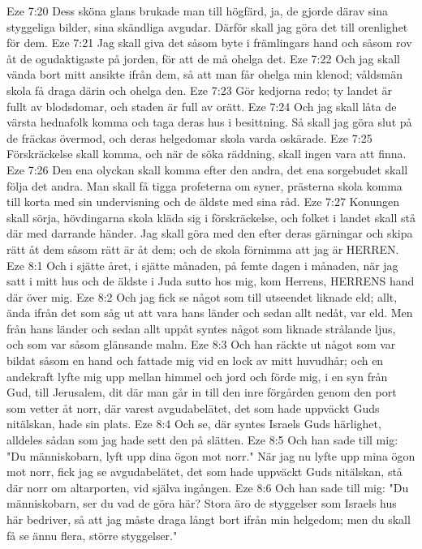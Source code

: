 Eze 7:20  Dess sköna glans brukade man till högfärd, ja, de gjorde därav sina styggeliga bilder, sina skändliga avgudar. Därför skall jag göra det till orenlighet för dem.
Eze 7:21  Jag skall giva det såsom byte i främlingars hand och såsom rov åt de ogudaktigaste på jorden, för att de må ohelga det.
Eze 7:22  Och jag skall vända bort mitt ansikte ifrån dem, så att man får ohelga min klenod; våldsmän skola få draga därin och ohelga den.
Eze 7:23  Gör kedjorna redo; ty landet är fullt av blodsdomar, och staden är full av orätt.
Eze 7:24  Och jag skall låta de värsta hednafolk komma och taga deras hus i besittning. Så skall jag göra slut på de fräckas övermod, och deras helgedomar skola varda oskärade.
Eze 7:25  Förskräckelse skall komma, och när de söka räddning, skall ingen vara att finna.
Eze 7:26  Den ena olyckan skall komma efter den andra, det ena sorgebudet skall följa det andra. Man skall få tigga profeterna om syner, prästerna skola komma till korta med sin undervisning och de äldste med sina råd.
Eze 7:27  Konungen skall sörja, hövdingarna skola kläda sig i förskräckelse, och folket i landet skall stå där med darrande händer. Jag skall göra med den efter deras gärningar och skipa rätt åt dem såsom rätt är åt dem; och de skola förnimma att jag är HERREN.
Eze 8:1  Och i sjätte året, i sjätte månaden, på femte dagen i månaden, när jag satt i mitt hus och de äldste i Juda sutto hos mig, kom Herrens, HERRENS hand där över mig.
Eze 8:2  Och jag fick se något som till utseendet liknade eld; allt, ända ifrån det som såg ut att vara hans länder och sedan allt nedåt, var eld. Men från hans länder och sedan allt uppåt syntes något som liknade strålande ljus, och som var såsom glänsande malm.
Eze 8:3  Och han räckte ut något som var bildat såsom en hand och fattade mig vid en lock av mitt huvudhår; och en andekraft lyfte mig upp mellan himmel och jord och förde mig, i en syn från Gud, till Jerusalem, dit där man går in till den inre förgården genom den port som vetter åt norr, där varest avgudabelätet, det som hade uppväckt Guds nitälskan, hade sin plats.
Eze 8:4  Och se, där syntes Israels Guds härlighet, alldeles sådan som jag hade sett den på slätten.
Eze 8:5  Och han sade till mig: "Du människobarn, lyft upp dina ögon mot norr." När jag nu lyfte upp mina ögon mot norr, fick jag se avgudabelätet, det som hade uppväckt Guds nitälskan, stå där norr om altarporten, vid själva ingången.
Eze 8:6  Och han sade till mig: "Du människobarn, ser du vad de göra här? Stora äro de styggelser som Israels hus här bedriver, så att jag måste draga långt bort ifrån min helgedom; men du skall få se ännu flera, större styggelser."
